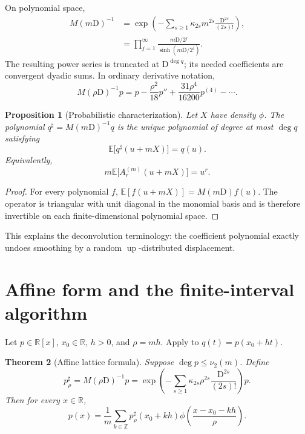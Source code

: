 \documentclass[11pt,oneside]{article}
\newtheorem{theorem}{Theorem}[section]
\newtheorem{proposition}[theorem]{Proposition}
\theoremstyle{definition}
\theoremstyle{remark}
\newcommand{\R}{\mathbb R}
\newcommand{\Z}{\mathbb Z}
\newcommand{\Up}{\operatorname{up}}
\newcommand{\E}{\mathbb E}
\newcommand{\vtwo}{\nu_2}
\newcommand{\D}{\mathrm D}
\begin{document}
On polynomial space,
\begin{align}
 M(m\D)^{-1}
 &=\exp\!\left(-\sum_{s\ge1}\kappa_{2s}m^{2s}
                   \frac{\D^{2s}}{(2s)!}\right),\label{eq:inverse-exp}\\
 &=\prod_{j=1}^{\infty}
     \frac{m\D/2^j}{\sinh(m\D/2^j)}.\label{eq:inverse-product}
\end{align}
The resulting power series is truncated at \(\D^{\deg q}\); its needed
coefficients are convergent dyadic sums.  In ordinary derivative notation,
\[
 M(\rho\D)^{-1}p
 =p-\frac{\rho^2}{18}p''+\frac{31\rho^4}{16200}p^{(4)}-\cdots.
\]

\begin{proposition}[Probabilistic characterization]
\label{prop:prob-characterization}
Let \(X\) have density \(\phi\).  The polynomial
\(q^\sharp=M(m\D)^{-1}q\) is the unique polynomial of degree at most
\(\deg q\) satisfying
\begin{equation}
 \E\bigl[q^\sharp(u+mX)\bigr]=q(u).
 \label{eq:prob-deconv}
\end{equation}
Equivalently,
\[
 m\E\bigl[A_r^{(m)}(u+mX)\bigr]=u^r.
\]
\end{proposition}

\begin{proof}
For every polynomial \(f\),
\(\E[f(u+mX)]=M(m\D)f(u)\).  The operator is triangular with unit diagonal in
the monomial basis and is therefore invertible on each finite-dimensional
polynomial space.
\end{proof}

This explains the deconvolution terminology: the coefficient polynomial exactly
undoes smoothing by a random \(\Up\)-distributed displacement.

\section{Affine form and the finite-interval algorithm}
\label{sec:interval-algorithm}

Let \(p\in\R[x]\), \(x_0\in\R\), \(h>0\), and \(\rho=mh\).  Apply
 to \(q(t)=p(x_0+ht)\).

\begin{theorem}[Affine lattice formula]
\label{thm:affine-formula}
Suppose \(\deg p\le\vtwo(m)\).  Define
\begin{equation}
 p_\rho^\sharp=M(\rho\D)^{-1}p
 =\exp\!\left(-\sum_{s\ge1}\kappa_{2s}\rho^{2s}
             \frac{\D^{2s}}{(2s)!}\right)p.
 \label{eq:physical-deconv}
\end{equation}
Then for every \(x\in\R\),
\begin{equation}
 \boxed{\displaystyle
 p(x)=\frac1m\sum_{k\in\Z}p_\rho^\sharp(x_0+kh)
       \phi\!\left(\frac{x-x_0-kh}{\rho}\right).}
 \label{eq:physical-global}
\end{equation}
\end{theorem}
\end{document}
